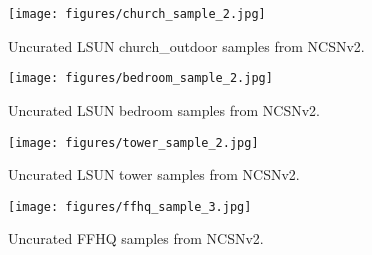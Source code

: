 \documentclass{article}
\begin{document}
\newpage
\vspace*{\fill}
\begin{figure}[H]
    \centering
    \texttt{[image: figures/church\_sample\_2.jpg]}
    \caption{Uncurated LSUN church\_outdoor  samples from NCSNv2.}
    \label{fig:church_full}
\end{figure}
\vspace*{\fill}

\newpage
\vspace*{\fill}
\begin{figure}[H]
    \centering
    \texttt{[image: figures/bedroom\_sample\_2.jpg]}
    \caption{Uncurated LSUN bedroom  samples from NCSNv2.}
    \label{fig:bedroom_full}
\end{figure}
\vspace*{\fill}


\newpage
\vspace*{\fill}
\begin{figure}[H]
    \centering
    \texttt{[image: figures/tower\_sample\_2.jpg]}
    \caption{Uncurated LSUN tower  samples from NCSNv2.}
    \label{fig:tower_full}
\end{figure}
\vspace*{\fill}

\newpage
\vspace*{\fill}
\begin{figure}[H]
    \centering
    \texttt{[image: figures/ffhq\_sample\_3.jpg]}
    \caption{Uncurated FFHQ  samples from NCSNv2.}
    \label{fig:ffhq_full}
\end{figure}
\vspace*{\fill} 
\end{document}
